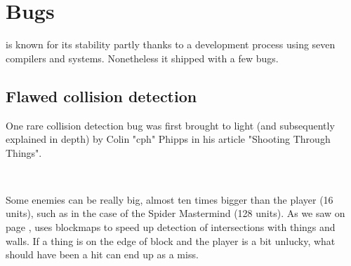 \vspace{-20pt}
\section{Bugs}
\doom{} is known for its stability partly thanks to a development process using seven compilers and systems. Nonetheless it shipped with a few bugs.








\subsection{Flawed collision detection}
One rare collision detection bug was first brought to light (and subsequently explained in depth) by Colin "cph" Phipps in his article "Shooting Through Things".\\
\par
{}\\
\par
Some enemies can be really big, almost ten times bigger than the player (16 units), such as in the case of the Spider Mastermind (128 units). As we saw on page \pageref{E1M1_blockmap}, \doom{} uses blockmaps to speed up detection of intersections with things and walls. If a thing is on the edge of block and the player is a bit unlucky, what should have been a hit can end up as a miss.

\vspace{-1cm}


